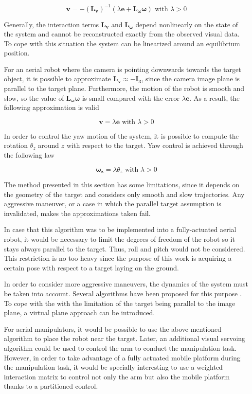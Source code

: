 \begin{equation}
\bm{v} = - (\bm{L_v})^{-1} (\lambda \bm{e} + \bm{L_\omega} \bm{\omega}) \text{ with } \lambda > 0
\end{equation}

Generally, the interaction terms $\bm{L_v}$ and $\bm{L_\omega}$ depend nonlinearly on the state of the system and cannot be reconstructed exactly from the observed visual data. To cope with this situation the system can be linearized around an equilibrium position.

For an aerial robot where the camera is pointing downwards towards the target object, it is possible to approximate $\bm{L_v} \approx - \bm{I}_3$, since the camera image plane is parallel to the target plane. Furthermore, the motion of the robot is smooth and slow, so the value of $\bm{L_\omega} \bm{\omega}$ is small compared with the error $\lambda \bm{e}$. As a result, the following approximation is valid

\begin{equation}
\bm{v} = \lambda \bm{e} \text{ with } \lambda > 0
\end{equation}

In order to control the yaw motion of the system, it is possible to compute the rotation $\theta_z$ around $z$ with respect to the target. Yaw control is achieved through the following law

\begin{equation}
\bm{\omega_z} = \lambda \theta_z \text{ with } \lambda > 0
\end{equation}

The method presented in this section has some limitations, since it depends on the geometry of the target and considers only smooth and slow trajectories. Any aggressive maneuver, or a case in which the parallel target assumption is invalidated, makes the approximations taken fail.

In case that this algorithm was to be implemented into a fully-actuated aerial robot, it would be necessary to limit the degrees of freedom of the robot so it stays always parallel to the target. Thus, roll and pitch would not be considered. This restriction is no too heavy since the purpose of this work is acquiring a certain pose with respect to a target laying on the ground. 

In order to consider more aggressive maneuvers, the dynamics of the system must be taken into account. Several algorithms have been proposed for this purpose \cite{ozawa_2011} \cite{jabbari_dynamic_2012} \cite{ceren_image_2012}. To cope with the with the limitation of the target being parallel to the image plane, a virtual plane approach \cite{zheng_image-based_2017} can be introduced.

For aerial manipulators, it would be possible to use the above mentioned algorithm to place the robot near the target. Later, an additional visual servoing algorithm could be used to control the arm to conduct the manipulation task. However, in order to take advantage of a fully actuated mobile platform during the manipulation task, it would be specially interesting to use a weighted interaction matrix \cite{santamaria-navarro_uncalibrated_2017} to control not only the arm but also the mobile platform thanks to a partitioned control.